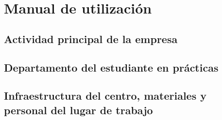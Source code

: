 \section{Manual de utilización}
\subsection{Actividad principal de la empresa}


\subsection{Departamento del estudiante en prácticas}


\subsection{Infraestructura del centro, materiales y personal del lugar de trabajo}


\newpage